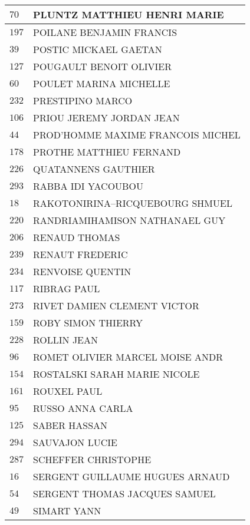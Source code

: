 \begin{xltabular}{\linewidth}{|l|X|}
    \hline
    $70$ & PLUNTZ MATTHIEU HENRI MARIE \\
    \hline
    $197$ & POILANE BENJAMIN FRANCIS \\
    \hline
    $39$ & POSTIC MICKAEL GAETAN \\
    \hline
    $127$ & POUGAULT BENOIT OLIVIER \\
    \hline
    $60$ & POULET MARINA MICHELLE \\
    \hline
    $232$ & PRESTIPINO MARCO \\
    \hline
    $106$ & PRIOU JEREMY JORDAN JEAN \\
    \hline
    $44$ & PROD'HOMME MAXIME FRANCOIS MICHEL \\
    \hline
    $178$ & PROTHE MATTHIEU FERNAND \\
    \hline
    $226$ & QUATANNENS GAUTHIER \\
    \hline
    $293$ & RABBA IDI YACOUBOU \\
    \hline
    $18$ & RAKOTONIRINA--RICQUEBOURG SHMUEL \\
    \hline
    $220$ & RANDRIAMIHAMISON NATHANAEL GUY \\
    \hline
    $206$ & RENAUD THOMAS \\
    \hline
    $239$ & RENAUT FREDERIC \\
    \hline
    $234$ & RENVOISE QUENTIN \\
    \hline
    $117$ & RIBRAG PAUL \\
    \hline
    $273$ & RIVET DAMIEN CLEMENT VICTOR \\
    \hline
    $159$ & ROBY SIMON THIERRY \\
    \hline
    $228$ & ROLLIN JEAN \\
    \hline
    $96$ & ROMET OLIVIER MARCEL MOISE ANDR \\
    \hline
    $154$ & ROSTALSKI SARAH MARIE NICOLE \\
    \hline
    $161$ & ROUXEL PAUL \\
    \hline
    $95$ & RUSSO ANNA CARLA \\
    \hline
    $125$ & SABER HASSAN \\
    \hline
    $294$ & SAUVAJON LUCIE \\
    \hline
    $287$ & SCHEFFER CHRISTOPHE \\
    \hline
    $16$ & SERGENT GUILLAUME HUGUES ARNAUD \\
    \hline
    $54$ & SERGENT THOMAS JACQUES SAMUEL \\
    \hline
    $49$ & SIMART YANN \\

\end{xltabular}
